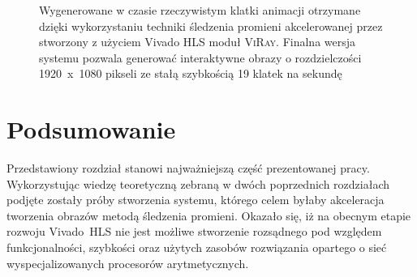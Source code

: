 \begin{figure}[H]
\centering
{}
\caption[Wygenerowane w czasie rzeczywistym klatki animacji otrzymane dzięki wykorzystaniu techniki śledzenia promieni akcelerowanej przez stworzony z użyciem Vivado HLS moduł \textsc{ViRay}]{Wygenerowane w czasie rzeczywistym klatki animacji otrzymane dzięki wykorzystaniu techniki śledzenia promieni akcelerowanej przez stworzony z użyciem Vivado HLS moduł \textsc{ViRay}. Finalna wersja systemu pozwala generować interaktywne obrazy o rozdzielczości 1920~x~1080 pikseli ze stałą szybkością 19 klatek na sekundę}
\label{ch3:img:system}
\end{figure}



\section*{Podsumowanie}
Przedstawiony rozdział stanowi najważniejszą część prezentowanej pracy. Wykorzystując wiedzę teoretyczną zebraną w dwóch poprzednich rozdziałach podjęte zostały próby stworzenia systemu, którego celem byłaby akceleracja tworzenia obrazów metodą śledzenia promieni. Okazało się, iż na obecnym etapie rozwoju Vivado~HLS nie jest możliwe stworzenie rozsądnego pod względem funkcjonalności, szybkości oraz użytych zasobów rozwiązania opartego o sieć wyspecjalizowanych procesorów arytmetycznych. 

